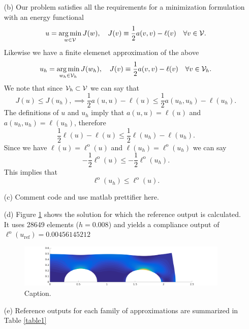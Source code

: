 \documentclass{article}
\begin{document}
\begin{itemize}
	\item[(b)] Our problem satisfies all the requirements for a minimization formulation with an energy functional 
	\begin{equation*}
		u = \operatorname*{arg\,min}\limits_{w\in\mathcal{V}} J(w), \quad J(v) \equiv \dfrac{1}{2}a(v,v) - \ell(v) \quad \forall v \in \mathcal{V}.
	\end{equation*}
	Likewise we have a finite elemenet approximation of the above
	\begin{equation*}
		u_h = \operatorname*{arg\,min}\limits_{w_h\in\mathcal{V}_h} J(w_h), \quad J(v) \equiv \dfrac{1}{2}a(v,v) - \ell(v) \quad \forall v \in \mathcal{V}_h.
	\end{equation*}
	We note that since \(\mathcal{V}_h \subset \mathcal{V} \) we can say that
	\begin{equation*}
		J(u) \leq J(u_h), \implies \dfrac{1}{2}a(u,u) - \ell(u) \leq \dfrac{1}{2}a(u_h,u_h) - \ell(u_h).
	\end{equation*}
	The definitions of \(u\) and \(u_h\) imply that \(a(u,u) = \ell(u) \) and  \(a(u_h,u_h) = \ell(u_h) \), therefore
	\begin{equation*}
		\dfrac{1}{2}\ell(u) - \ell(u) \leq \dfrac{1}{2}\ell(u_h) - \ell(u_h).
	\end{equation*}
	Since we have \(\ell(u) = \ell^\text{o}(u) \) and \(\ell(u_h) = \ell^\text{o}(u_h) \) we can say
	\begin{equation*}
		-\dfrac{1}{2}\ell^\text{o}(u) \leq -\dfrac{1}{2}\ell^\text{o}(u_h).
	\end{equation*}
	This implies that 
	\begin{equation*}
		\ell^\text{o}(u_h) \leq \ell^\text{o}(u).
	\end{equation*}
	\item[(c)] Comment code and use matlab prettifier here.
	\item[(d)] Figure \ref{refsoln} shows the solution for which the reference output is calculated. It uses 28649 elements (\(h = 0.008 \)) and yields a compliance output of \(\ell^\text{o}(u_\text{ref}) = 0.00456145212 \)
	\begin{figure}[H]
		\centering
		\includegraphics[width=0.95\textwidth]{test.pdf}
		\caption{Caption.}
		\label{refsoln}
	\end{figure}
	\item[(e)] Reference outputs for each family of approximations are summarized in Table \ref{table1}
			   

\end{itemize}
\end{document}
